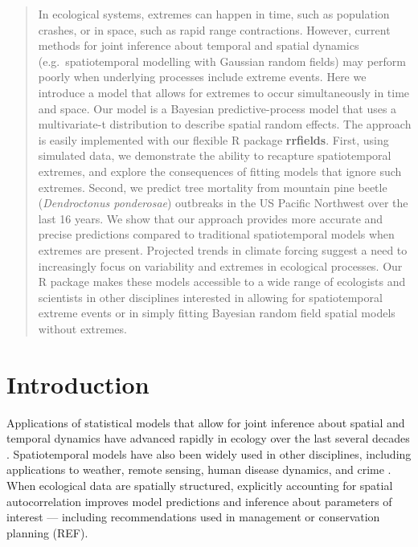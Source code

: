 \documentclass[12pt,english]{article}
\begin{document}
\begin{spacing}{1.9}
\linenumbers

\begin{abstract}

In ecological systems, extremes can happen
in time, such as population crashes,
or in space, such as rapid range contractions.
However, current methods for
joint inference about temporal and spatial dynamics
(e.g.\ spatiotemporal modelling with Gaussian random fields)
may perform poorly when
underlying processes include extreme events.
Here we introduce a model that allows for extremes
to occur simultaneously in time and space.
Our model is a Bayesian predictive-process model
that uses a multivariate-t distribution to describe spatial random effects.
The approach is easily implemented with
our flexible R package \textbf{rrfields}.
First, using simulated data,
we demonstrate the ability to recapture spatiotemporal extremes,
and explore the consequences of fitting models that ignore such extremes.
Second, we predict
tree mortality from mountain pine beetle (\emph{Dendroctonus ponderosae})
outbreaks in the US Pacific Northwest over the last 16 years.
We show that our approach provides
more accurate and precise predictions
compared to traditional spatiotemporal models
when extremes are present.
Projected trends in climate forcing
suggest a need to increasingly focus on
variability and extremes in ecological processes.
Our R package makes these models
accessible to a wide range of ecologists
and scientists in other disciplines interested in
allowing for spatiotemporal extreme events
or in simply fitting Bayesian random field
spatial models without extremes.

\end{abstract}

\section{Introduction}


Applications of statistical models that allow for joint inference about spatial
and temporal dynamics have advanced rapidly in ecology over the last several
decades \citep[e.g.][]{bascompte1995, latimer2009}. Spatiotemporal models have
also been widely used in other disciplines, including applications to weather,
remote sensing, human disease dynamics, and crime \citep{cressie2011}. When
ecological data are spatially structured, explicitly accounting for spatial
autocorrelation improves model predictions and inference about parameters of
interest --- including recommendations used in management or conservation
planning (REF).


\end{spacing}
\end{document}

